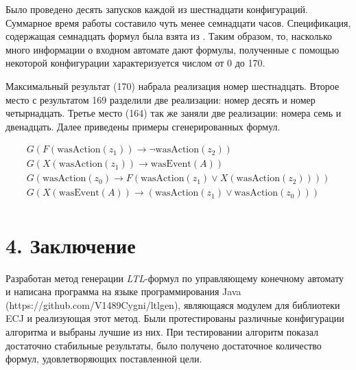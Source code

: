 \documentclass[12pt,fleqn]{article}
\begin{document}
Было проведено десять запусков каждой из шестнадцати конфигураций. Суммарное время работы составило чуть менее семнадцати часов.
Спецификация, содержащая семнадцать формул была взята из \cite{eg}.
Таким образом, то, насколько много информации о входном автомате дают формулы, полученные с помощью некоторой конфигурации
характеризуется числом от 0 до 170.

Максимальный результат (170) набрала реализация номер шестнадцать. Второе место с результатом 169 разделили две реализации:
номер десять и номер четырнадцать. Третье место (164) так же заняли две реализации: номера семь и двенадцать.
Далее приведены примеры сгенерированных формул. 

\begin{multline*}
G(F(\text{wasAction}(z_1)) \rightarrow \lnot \text{wasAction}(z_2))\\
G(X(\text{wasAction}(z_1)) \rightarrow \text{wasEvent}(A))\\
G(\text{wasAction}(z_0) \rightarrow F(\text{wasAction}(z_1) \vee X(\text{wasAction}(z_2))))\\
G(X(\text{wasEvent}(A)) \rightarrow (\text{wasAction}(z_1) \vee \text{wasAction}(z_0)))\\
\end{multline*}

\section{4. Заключение}

Разработан метод генерации \textit{LTL}-формул по управляющему конечному автомату и написана программа на языке программирования Java
(https://github.com/V1489Cygni/ltlgen), являющаяся модулем для библиотеки ECJ и реализующая этот метод.
Были протестированы различные конфигурации алгоритма и выбраны лучшие из них. При тестировании алгоритм показал
достаточно стабильные результаты, было получено достаточное количество формул, удовлетворяющих поставленной цели.
\end{document}
